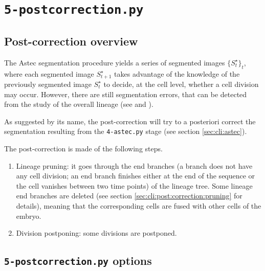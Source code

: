 \section{\texttt{5-postcorrection.py}}
\label{sec:cli:post:correction}

\subsection{Post-correction overview}

The Astec segmentation procedure yields a series of segmented images $\{S^{\star}_t\}_t$, where each segmented image $S^{\star}_{t+1}$ takes advantage of the knowledge of the previously segmented image $S^{\star}_t$ to decide, at the cell level, whether a cell division may occur. However, there are still segmentation errors, that can be detected from the study of the overall lineage (see \cite[section 2.3.3.7, page 74]{guignard:tel-01278725} and \cite[supp. mat.]{guignard:hal-02903409}).

As suggested by its name, the post-correction will try to a posteriori correct the segmentation resulting from the  \verb|4-astec.py| stage (see section \ref{sec:cli:astec}). 

The post-correction is made of the following steps.
\begin{enumerate}
\item \label{it:post:pruning} Lineage pruning: 
it goes through the end branches (a branch does not have any cell division; an end branch finishes either at the end of the sequence or the cell vanishes between two time points) of the lineage tree.
Some lineage end branches are deleted (see section \ref{sec:cli:post:correction:pruning} for details), meaning that the corresponding cells are fused with other cells of the embryo.
\item \label{it:post:division} Division postponing: some divisions are postponed.
\end{enumerate}



\subsection{\texttt{5-postcorrection.py} options}

